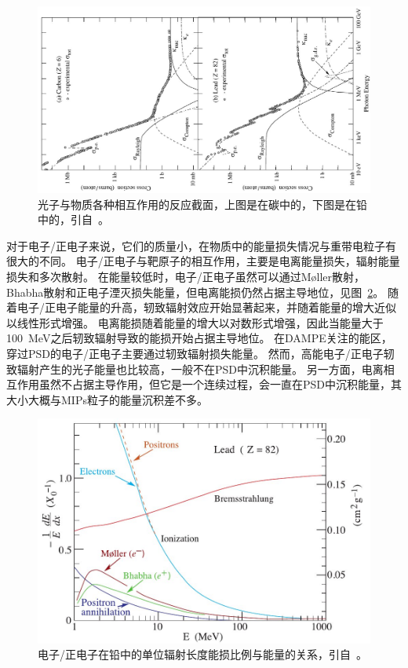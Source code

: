 \begin{figure}[t]
	\centering
	\includegraphics[width=0.9\linewidth,angle=270]{chap/description/fig/photon_energyloss}
	\caption{光子与物质各种相互作用的反应截面，上图是在碳中的，下图是在铅中的，引自~\parencite{pdg_book}。}
	\label{fig:ch2:photon_energyloss}
\end{figure}

对于电子/正电子来说，它们的质量小，在物质中的能量损失情况与重带电粒子有很大的不同。
电子/正电子与靶原子的相互作用，主要是电离能量损失，辐射能量损失和多次散射。
在能量较低时，电子/正电子虽然可以通过Møller散射，Bhabha散射和正电子湮灭损失能量，但电离能损仍然占据主导地位，见图~\ref{fig:ch2:electron_energyloss}。
随着电子/正电子能量的升高，轫致辐射效应开始显著起来，并随着能量的增大近似以线性形式增强。
电离能损随着能量的增大以对数形式增强，因此当能量大于\SI{100}{MeV}之后轫致辐射导致的能损开始占据主导地位。
在DAMPE关注的能区，穿过PSD的电子/正电子主要通过轫致辐射损失能量。
然而，高能电子/正电子轫致辐射产生的光子能量也比较高，一般不在PSD中沉积能量。
另一方面，电离相互作用虽然不占据主导作用，但它是一个连续过程，会一直在PSD中沉积能量，其大小大概与MIPs粒子的能量沉积差不多。

\begin{figure}
\centering
\includegraphics[width=0.8\linewidth]{chap/description/fig/electron_energyloss}
\caption{电子/正电子在铅中的单位辐射长度能损比例与能量的关系，引自~\parencite{pdg_book}。}
\label{fig:ch2:electron_energyloss}
\end{figure}

